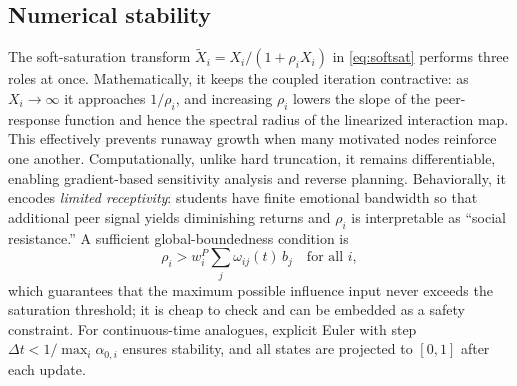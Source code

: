 \documentclass[11pt]{article}
\begin{document}
\subsection{Numerical stability}\label{sec:stability}
The soft-saturation transform $\tilde X_i=X_i/(1+\rho_i X_i)$ in \eqref{eq:softsat} performs three roles at once. Mathematically, it keeps the coupled iteration contractive: as $X_i\to\infty$ it approaches $1/\rho_i$, and increasing $\rho_i$ lowers the slope of the peer-response function and hence the spectral radius of the linearized interaction map. This effectively prevents runaway growth when many motivated nodes reinforce one another. Computationally, unlike hard truncation, it remains differentiable, enabling gradient-based sensitivity analysis and reverse planning. Behaviorally, it encodes \emph{limited receptivity}: students have finite emotional bandwidth so that additional peer signal yields diminishing returns and $\rho_i$ is interpretable as ``social resistance.'' A sufficient global-boundedness condition is 
\begin{equation*}
\rho_i > w^{P}_i\textstyle\sum_j \omega_{ij}(t)\,b_j\quad\text{for all }i,
\end{equation*}
which guarantees that the maximum possible influence input never exceeds the saturation threshold; it is cheap to check and can be embedded as a safety constraint. For continuous-time analogues, explicit Euler with step $\Delta t<1/\max_i\alpha_{0,i}$ ensures stability, and all states are projected to $[0,1]$ after each update.
\end{document}

